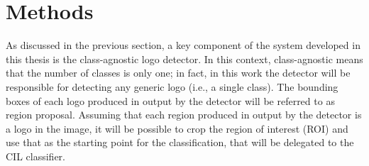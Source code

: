 \chapter{Methods}
\label{chap:methods}

As discussed in the previous section, a key component of the system developed in this thesis is the class-agnostic logo detector. In this context, class-agnostic means that the number of classes is only one; in fact, in this work the detector will be responsible for detecting any generic logo (i.e., a single class). The bounding boxes of each logo produced in output by the detector will be referred to as region proposal. Assuming that each region produced in output by the detector is a logo in the image, it will be possible to crop the region of interest (ROI) and use that as the starting point for the classification, that will be delegated to the CIL classifier.
